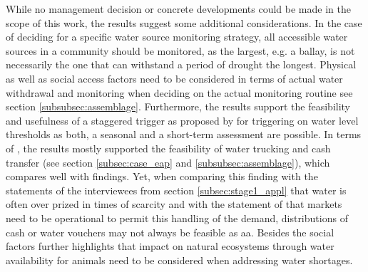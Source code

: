 While no management decision or concrete developments could be made in the scope of this work, the results suggest some additional considerations. In the case of deciding for a specific water source monitoring strategy, all accessible water sources in a community should be monitored, as the largest, e.g. a ballay, is not necessarily the one that can withstand a period of drought the longest. Physical as well as social access factors need to be considered in terms of actual water withdrawal and monitoring when deciding on the actual monitoring routine see section \ref{subsubsec:assemblage}. Furthermore, the results support the feasibility and usefulness of a staggered trigger as proposed by \autocite{rcrcFORECASTBASEDFINANCINGEARLY2020} for triggering on water level thresholds as both, a seasonal and a short-term assessment are possible. In terms of , the results mostly supported the feasibility of water trucking and cash transfer  (see section \ref{subsec:case_eap} and \ref{subsubsec:assemblage}), which compares well with \autocite{gettliffeOCHAAnticipatoryAction2021} findings. Yet, when comparing this finding with the statements of the interviewees from section \ref{subsec:stage1_appl} that water is often over prized in times of scarcity and with the statement of \autocite{ochaANTICIPATORYACTIONPLAN2020} that markets need to be operational to permit this handling of the demand, distributions of cash or water vouchers may not always be feasible as \acrshort{aa}. Besides the social factors \autocite{birchSomalilandSomaliRegion2008} further highlights that impact on natural ecosystems through water availability for animals need to be considered when addressing water shortages. 
